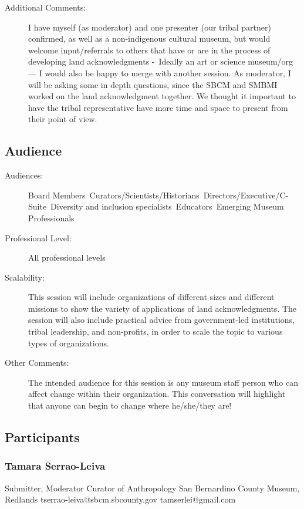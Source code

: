 \documentclass{report}
\begin{document}
\begin{description}
                    \item [Additional Comments: ]I have myself (as moderator) and one presenter (our tribal partner) confirmed, as well as a non-indigenous cultural museum, but would welcome input/referrals to others that have or are in the process of developing land acknowledgments - Ideally an art or science museum/org --- I would also be happy to merge with another session.
As moderator, I will be asking some in depth questions, since the SBCM and SMBMI worked on the land acknowledgment together. We thought it important to have the tribal representative have more time and space to present from their point of view. 
 
  

                \end{description}
              \subsection*{Audience}
                \begin{description}
                  \item [Audiences:]Board Members~Curators/Scientists/Historians~Directors/Executive/C-Suite~Diversity and inclusion specialists~Educators~Emerging Museum Professionals~
                  \item[Professional Level:]All professional levels~
                \item[Scalability:]   This session will include organizations of different sizes and different missions to show the variety of applications of land acknowledgments. The session will also include practical advice from government-led institutions, tribal leadership, and non-profits, in order to scale the topic to various types of organizations. 
  

							
              \item[Other Comments:] The intended audience for this session is any museum staff person who can affect change within their organization. This conversation will highlight that anyone can begin to change where he/she/they are!
              \end{description}
            \subsection*{Participants}
              \subsubsection*{ Tamara  Serrao-Leiva }
              Submitter, Moderator\newline
              Curator of Anthropology\newline
              San Bernardino County Museum, Redlands
              \newline
              tserrao-leiva@sbcm.sbcounty.gov\newline
              tamserlei@gmail.com\newline
\end{document}
